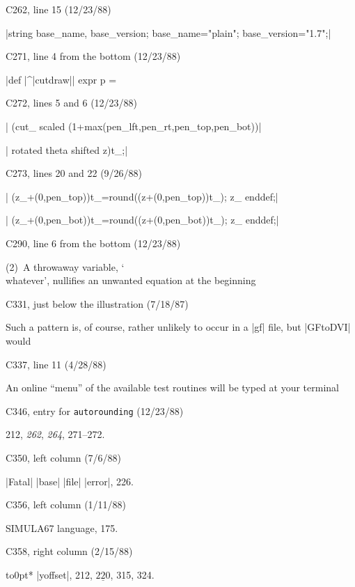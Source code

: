 \bugonpage C262, line 15 (12/23/88)

\ninepoint\noindent
|string base_name, base_version; base_name="plain"; base_version="1.7";|

\bugonpage C271, line 4 from the bottom (12/23/88)

\ninepoint\noindent
|def |^|cutdraw|| expr p = %

\bugonpage C272, lines 5 and 6 (12/23/88)

\ninepoint\noindent
|  (cut_ scaled (1+max(pen_lft,pen_rt,pen_top,pen_bot))|\par\noindent
|   rotated theta shifted z)t_;|

\bugonpage C273, lines 20 and 22 (9/26/88)

\ninepoint\noindent
|  (z_+(0,pen_top))t_=round((z+(0,pen_top))t_); z_ enddef;|\par\noindent
|  (z_+(0,pen_bot))t_=round((z+(0,pen_bot))t_); z_ enddef;|

\bugonpage C290, line 6 from the bottom (12/23/88)

\ninepoint\noindent
(2)~A throwaway variable,
`\\{whatever}', nullifies an unwanted equation at the beginning\cutpar

\bugonpage C331, just below the illustration (7/18/87)

\ninepoint\noindent
Such a pattern is, of course, rather unlikely to occur in a |gf| file,
but |GFtoDVI| would\cutpar

\bugonpage C337, line 11 (4/28/88)

\ninepoint
An online ``menu'' of the available test routines will be typed at your
terminal\cutpar

\bugonpage C346, entry for {\tt autorounding} (12/23/88)

\eightpoint\indent\hskip20pt
212, {\it262}, {\it264}, 271--272.

\bugonpage C350, left column (7/6/88)

\eightpoint\indent
|Fatal| |base| |file| |error|, 226.

\bugonpage C356, left column (1/11/88)

\eightpoint
SIMULA67 language, 175.

\bugonpage C358, right column (2/15/88)

\eightpoint\indent\hbox to0pt{\hss{}\hbox{*}}%
|yoffset|, 212, $\underline{220}$, 315, 324.
\hsize=35pc
\def\\#1{\hbox{\it#1\/\kern.05em}} %
\def\to{\mathrel{.\,.}} %

